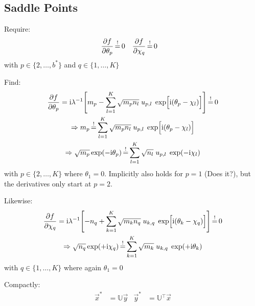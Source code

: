 \documentclass[
	english,
	a4paper,
	fontsize=10pt,
	parskip=half,
	titlepage=true,
	DIV=12,
	final
]{scrreprt}
\newcommand*{\Thus}{\ensuremath{\Rightarrow}\xspace}
\newcommand*{\transp}{\ensuremath{^\intercal}}
\newcommand*{\iunit}{\ensuremath{\mathrm{i}}}
\newcommand*{\equalCond}{  \mathop{=}\limits^!  }
\begin{document}
\subsection{Saddle Points}
\label{sec:saddles}
Require:
\begin{align}
	\pdv{f}{\theta_p} &\equalCond 0
&
	\pdv{f}{\chi  _q} &\equalCond 0 
\end{align}
with $p \in \{2, \ldots, b^*\}$ and $q \in \{1, \ldots, K\}$

Find:
\begin{gather}
	\pdv{f}{\theta_p}
=
	\iunit \lambda^{-1}
	\qty[
		m_p
		-
		\sum_{l=1}^{K}
			\sqrt{m_p n_l} \; u_{p,l} \; \exp[ \Big. \iunit(\theta_p - \chi_l)]
	]
	\label{eqn:Jacobiantheta}
\equalCond
	0 \\
\Thus
	m_p
\equalCond
	\sum_{l=1}^{K}
		\sqrt{m_p n_l} \; u_{p,l} \; \exp[ \Big. \iunit(\theta_p - \chi_l) ] \\
\Thus
	\sqrt{m_p} \exp(-\iunit \theta_p)
\equalCond
	\sum_{l=1}^{K} \sqrt{n_l} \; u_{p,l} \; \exp(-\iunit\chi_l)
	\label{eqn:FourierLinkForward}
\end{gather}
with $p \in \{2, \ldots, K\}$ where $\theta_1 = 0$. Implicitly also holds for $p=1$ {\color{red}(Does it?)}, but the derivatives only start at $p=2$.

Likewise:
\begin{gather}
	\pdv{f}{\chi_q}
=
	\iunit\lambda^{-1}
	\qty[
		- n_q
		+
		\sum_{k=1}^{K}
			\sqrt{m_k n_q} \; u_{k,q} \; \exp[ \Big. \iunit(\theta_k - \chi_q) ]
	]
	\label{eqn:JacobianChi}
\equalCond
	0 \\
\Thus
	\sqrt{n_q} \exp(+\iunit \chi_q)
\equalCond
	\sum_{k=1}^{K}
	\sqrt{m_k} \; u_{k,q} \; \exp(+\iunit\theta_k)
	\label{eqn:FourierLinkBackward}
\end{gather}
with $q \in \{1, \ldots, K\}$ where again $\theta_1 = 0$

Compactly:
\begin{align}
	\vec{x}^{*} &= \mathbb{U} \vec{y}
&
	\vec{y}^{*} &= \mathbb{U}\transp \vec{x}
	\label{eqn:MatrixCondition}
\end{align}
\end{document}
